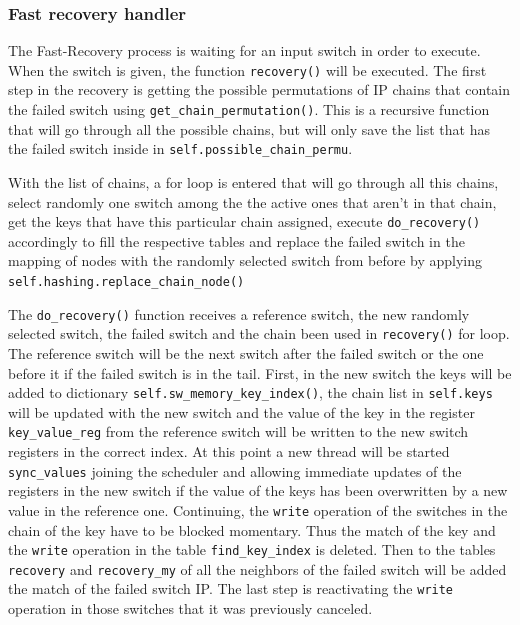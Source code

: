 \documentclass[11pt,oneside,a4paper]{article}
\begin{document}
\subsubsection{Fast recovery handler}

The Fast-Recovery process is waiting for an input switch in order to execute. When the switch is given, the function {\color{violet}\texttt{recovery()}} will be executed. The first step in the recovery is getting the possible permutations of IP chains that contain the failed switch using {\color{violet}\texttt{get\_chain\_permutation()}}. This is a recursive function that will go through all the possible chains, but will only save the list that has the failed switch inside in {\color{violet}\texttt{self.possible\_chain\_permu}}. 

With the list of chains, a for loop is entered that will go through all this chains, select randomly one switch among the the active ones that aren't in that chain, get the keys that have this particular chain assigned, execute {\color{violet}\texttt{do\_recovery()}} accordingly to fill the respective tables and replace the failed switch in the mapping of nodes with the randomly selected switch from before by applying {\color{violet}\texttt{self.hashing.replace\_chain\_node()}}

The {\color{violet}\texttt{do\_recovery()}} function receives a reference switch, the new randomly selected switch, the failed switch and the chain been used in {\color{violet}\texttt{recovery()}} for loop. The reference switch will be the next switch after the failed switch or the one before it if the failed switch is in the tail. First, in the new switch the keys will be added to dictionary {\color{violet}\texttt{self.sw\_memory\_key\_index()}}, the chain list in {\color{violet}\texttt{self.keys}} will be updated with the new switch and the value of the key in the register {\color{red}\texttt{key\_value\_reg}} from the reference switch will be written to the new switch registers in the correct index. At this point a new thread will be started {\color{violet}\texttt{sync\_values}} joining the scheduler and allowing immediate updates of the registers in the new switch if the value of the keys has been overwritten by a new value in the reference one. Continuing, the {\color{brown}\texttt{write}} operation of the switches in the chain of the key have to be blocked momentary. Thus the match of the key and the {\color{brown}\texttt{write}} operation in the table  {\color{brown}\texttt{find\_key\_index}} is deleted. Then to the tables {\color{red}\texttt{recovery}} and {\color{red}\texttt{recovery\_my}} of all the neighbors of the failed switch will be added the match of the failed switch IP. The last step is reactivating the {\color{brown}\texttt{write}} operation in those switches that it was previously canceled. 
\end{document}
